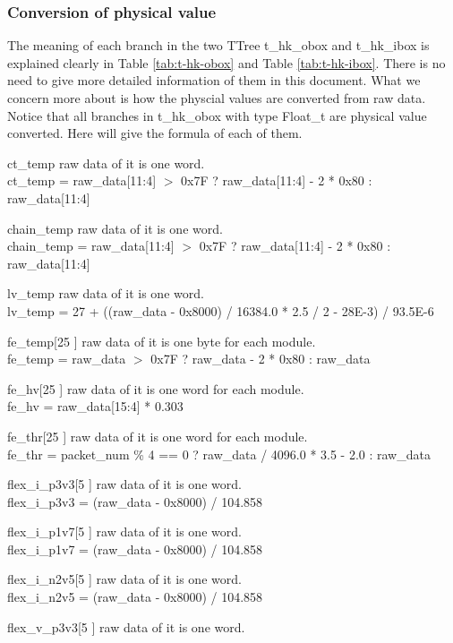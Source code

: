 \documentclass[a4paper, 12pt, onecolumn]{article}
\begin{document}
\subsubsection{Conversion of physical value}
The meaning of each branch in the two TTree t\_hk\_obox and t\_hk\_ibox is explained clearly in Table \ref{tab:t-hk-obox} and Table \ref{tab:t-hk-ibox}.
There is no need to give more detailed information of them in this document.
What we concern more about is how the physcial values are converted from raw data. 
Notice that all branches in t\_hk\_obox with type Float\_t are physical value converted.
Here will give the formula of each of them.

\begin{asparadesc}
\item[ct\_temp] raw data of it is one word. \\
  ct\_temp = raw\_data[11:4] $>$ 0x7F ? raw\_data[11:4] - 2 * 0x80 : raw\_data[11:4]
\item[chain\_temp] raw data of it is one word. \\
  chain\_temp = raw\_data[11:4] $>$ 0x7F ? raw\_data[11:4] - 2 * 0x80 : raw\_data[11:4]
\item[lv\_temp] raw data of it is one word. \\
  lv\_temp = 27 + ((raw\_data - 0x8000) / 16384.0 * 2.5 / 2 - 28E-3) / 93.5E-6
\item[fe\_temp[25]] raw data of it is one byte for each module. \\
  fe\_temp = raw\_data $>$ 0x7F ? raw\_data - 2 * 0x80 : raw\_data
\item[fe\_hv[25]] raw data of it is one word for each module. \\
  fe\_hv = raw\_data[15:4] * 0.303
\item[fe\_thr[25]] raw data of it is one word for each module. \\
  fe\_thr = packet\_num \% 4 == 0 ? raw\_data / 4096.0 * 3.5 - 2.0 : raw\_data
\item[flex\_i\_p3v3[5]] raw data of it is one word. \\
  flex\_i\_p3v3 = (raw\_data - 0x8000) / 104.858
\item[flex\_i\_p1v7[5]] raw data of it is one word. \\
  flex\_i\_p1v7 = (raw\_data - 0x8000) / 104.858
\item[flex\_i\_n2v5[5]] raw data of it is one word. \\
  flex\_i\_n2v5 = (raw\_data - 0x8000) / 104.858
\item[flex\_v\_p3v3[5]] raw data of it is one word. \\

\end{asparadesc}
\end{document}
